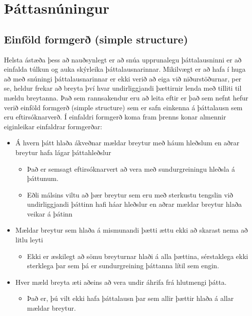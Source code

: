 \documentclass[]{book}
\providecommand{\tightlist}{%
  \setlength{\itemsep}{0pt}\setlength{\parskip}{0pt}}
\begin{document}
\hypertarget{uxfeuxe1ttasnuxfaningur}{%
\section{Þáttasnúningur}\label{uxfeuxe1ttasnuxfaningur}}

\hypertarget{einfuxf6ld-formgeruxf0-simple-structure}{%
\subsection{Einföld formgerð (simple structure)}\label{einfuxf6ld-formgeruxf0-simple-structure}}

Helsta ástæða þess að nauðsynlegt er að snúa upprunalegu þáttalausninni er að einfalda túlkun og auka skýrleika þáttalausnarinnar. Mikilvægt er að hafa í huga að með snúningi þáttalausnarinnar er ekki verið að eiga við niðurstöðurnar, per se, heldur frekar að breyta því hvar undirliggjandi þættirnir lenda með tilliti til mældu breytanna. Það sem rannsakendur eru að leita eftir er það sem nefnt hefur verið einföld formgerð (simple structure) sem er safn einkenna á þáttalausn sem eru eftirsóknarverð. Í einfaldri formgerð koma fram þrenns konar almennir eiginleikar einfaldrar formgerðar:

\begin{itemize}
\tightlist
\item
  Á hvern þátt hlaða ákveðnar mældar breytur með háum hleðslum en aðrar breytur hafa lágar þáttahleðslur

  \begin{itemize}
  \tightlist
  \item
    Það er semsagt eftirsóknarvert að vera með sundurgreiningu hleðsla á þáttunum.
  \item
    Eðli málsins viltu að þær breytur sem eru með sterkustu tengslin við undirliggjandi þáttinn hafi háar hleðslur en aðrar mældar breytur hlaða veikar á þátinn
  \end{itemize}
\item
  Mældar breytur sem hlaða á mismunandi þætti ættu ekki að skarast nema að litlu leyti

  \begin{itemize}
  \tightlist
  \item
    Ekki er æskilegt að sömu breyturnar hlaði á alla þættina, sérstaklega ekki sterklega þar sem þá er sundurgreining þáttanna lítil sem engin.
  \end{itemize}
\item
  Hver mæld breyta æti aðeins að vera undir áhrifa frá hlutmengi þátta.

  \begin{itemize}
  \tightlist
  \item
    Það er, þú vilt ekki hafa þáttalausn þar sem allir þættir hlaða á allar mældar breytur.
  \end{itemize}
\end{itemize}
\end{document}
